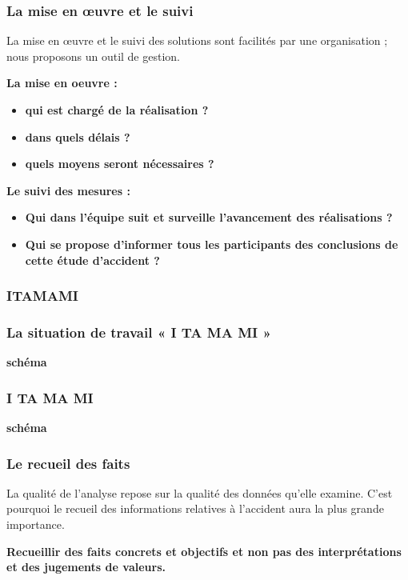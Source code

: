 \documentclass{beamer}
\begin{document}
\begin{frame}
\frametitle{La mise en œuvre et le suivi}

La mise en œuvre et le suivi des solutions sont facilités par une organisation ; nous proposons un outil de gestion.

\textbf{La mise en oeuvre :}
\begin{itemize}
\item \textbf{qui est chargé de la réalisation ?}
\item \textbf{dans quels délais ?}
\item \textbf{quels moyens seront nécessaires ?}
\end{itemize}
\textbf{Le suivi des mesures :}
\begin{itemize}
\item \textbf{Qui dans l’équipe suit et surveille l’avancement des réalisations ?}
\item  \textbf{Qui se propose d’informer tous les participants des conclusions de cette étude d’accident ?}
\end{itemize}
\end{frame}

\begin{frame}
\frametitle{ITAMAMI}


\end{frame}

\begin{frame}
\frametitle{La situation de travail « I TA MA MI »}

\textbf{schéma}
\end{frame}


\begin{frame}
\frametitle{I TA MA MI}

\textbf{schéma}
\end{frame}

\begin{frame}
\frametitle{Le recueil des faits}

La qualité de l’analyse repose sur la qualité des données qu’elle examine. C’est pourquoi le recueil des informations relatives à l’accident aura la plus grande importance.

\textbf{Recueillir des faits concrets et objectifs et non pas des interprétations et des jugements de valeurs.}

\end{frame}
\end{document}
